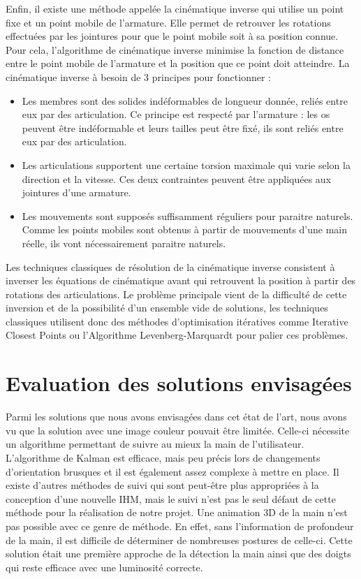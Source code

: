 Enfin, il existe une méthode appelée la cinématique inverse qui utilise un point fixe et un point mobile de l'armature. Elle permet de retrouver les rotations effectuées par les jointures pour que le point mobile soit à sa position connue. Pour cela, l'algorithme de cinématique inverse minimise la fonction de distance entre le point mobile de l'armature et la position que ce point doit atteindre.
La cinématique inverse à besoin de 3 principes pour fonctionner :

\begin{itemize}
	\item Les membres sont des solides indéformables de longueur donnée, reliés entre eux par des articulation. Ce principe est respecté par l'armature : les os peuvent être indéformable et leurs tailles peut être fixé, ils sont reliés entre eux par des articulation.
	\item Les articulations supportent une certaine torsion maximale qui varie selon la direction et la vitesse. Ces deux contraintes peuvent être appliquées aux jointures d'une armature.
	\item Les mouvements sont supposés suffisamment réguliers pour paraitre naturels. Comme les points mobiles sont obtenus à partir de mouvements d'une main réelle, ils vont nécessairement paraitre naturels.
\end{itemize}

Les techniques classiques de résolution de la cinématique inverse consistent à inverser les équations de cinématique avant qui retrouvent la position à partir des rotations des articulations.
Le problème principale vient de la difficulté de cette inversion et de la possibilité d'un ensemble vide de solutions, les techniques classiques utilisent donc des méthodes d'optimisation itératives comme Iterative Closest Points ou l'Algorithme Levenberg-Marquardt pour palier ces problèmes.

\section{Evaluation des solutions envisagées}
Parmi les solutions que nous avons envisagées dans cet état de l'art, nous avons vu que la solution avec une
image couleur pouvait être limitée. Celle-ci nécessite un algorithme permettant de suivre au mieux
la main de l'utilisateur. L'algorithme de Kalman est efficace, mais peu précis lors de changements d'orientation
brusques et il est également assez complexe à mettre en place. Il existe d'autres méthodes de suivi qui sont
peut-être plus appropriées à la conception d'une nouvelle IHM, mais le suivi n'est pas le seul défaut de cette
méthode pour la réalisation de notre projet. Une animation 3D de la main n'est pas possible avec ce genre de méthode. 
En effet, sans l'information de profondeur de la main, il est difficile de déterminer de nombreuses postures de celle-ci. 
Cette solution était une première approche de la détection la main ainsi que des doigts qui reste efficace avec une luminosité correcte.\\

